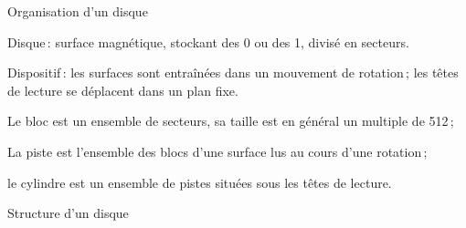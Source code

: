 

\begin{frame}
{Organisation d'un disque}

\alert{Disque}\,: surface magnétique, stockant des 0 ou des 1,
          divisé en secteurs.

\vfill


\alert{Dispositif}\,: les surfaces sont entraînées dans un mouvement de rotation\,;
              les têtes de lecture se déplacent dans un plan fixe.

\begin{blocgauche}
\begin{redbullet}
  \item Le \alert{bloc} est un ensemble de secteurs, sa
              taille est en général un multiple de 512\,;

  \item La \alert{piste} est l'ensemble des blocs d'une surface
       lus au cours d'une rotation\,;

  \item le  \alert{cylindre} est un ensemble de pistes situées
                    sous les têtes de lecture.
\end{redbullet}
\end{blocgauche}
\end{frame}

\begin{frame}
{Structure d'un disque}


\end{frame}

